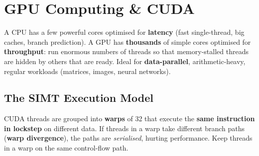 \documentclass[11pt,a4paper]{article}
\begin{document}
\section{GPU Computing \& CUDA}

\begin{conceptbox}
A CPU has a few powerful cores optimised for \textbf{latency} (fast single-thread, big caches, branch prediction). A GPU has \textbf{thousands} of simple cores optimised for \textbf{throughput}: run enormous numbers of threads so that memory-stalled threads are hidden by others that are ready. Ideal for \textbf{data-parallel}, arithmetic-heavy, regular workloads (matrices, images, neural networks).
\end{conceptbox}

\begin{center}
\end{center}

\subsection{The SIMT Execution Model}
\begin{definitionbox}
CUDA threads are grouped into \textbf{warps} of 32 that execute the \textbf{same instruction in lockstep} on different data. If threads in a warp take different branch paths (\textbf{warp divergence}), the paths are \emph{serialised}, hurting performance. Keep threads in a warp on the same control-flow path.
\end{definitionbox}
\end{document}
